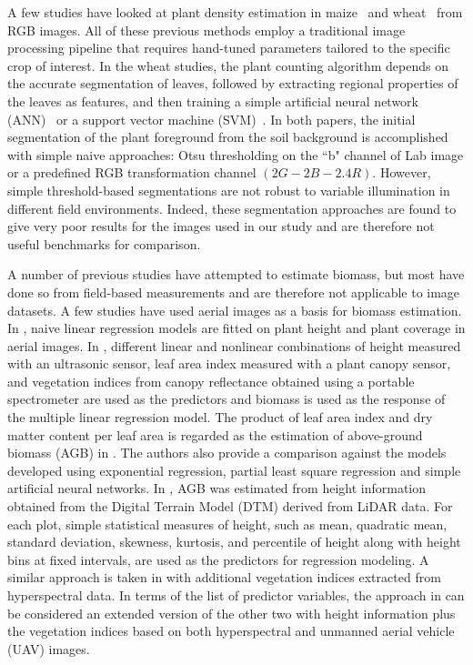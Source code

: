 \documentclass[10pt,twocolumn,letterpaper]{article}
\begin{document}
A few studies have looked at plant density estimation in maize~\cite{steward2001, steward2004, steward2005} and wheat~\cite{wheat-ann-2017, jin2017} from RGB images. All of these previous methods employ a traditional image processing pipeline that requires hand-tuned parameters tailored to the specific crop of interest.
In the wheat studies, the plant counting algorithm depends on the accurate segmentation of leaves, followed by extracting regional properties of the leaves as features, and then training a simple artificial neural network (ANN)~\cite{wheat-ann-2017} or a support vector machine (SVM)~\cite{jin2017}. In both papers, the initial segmentation of the plant foreground from the soil background is accomplished with simple naive approaches: Otsu thresholding on the ``b" channel of Lab image or a predefined RGB transformation channel $(2G-2B-2.4R)$. However, simple threshold-based segmentations are not robust to variable illumination in different field environments. Indeed, these segmentation approaches are found to give very poor results for the images used in our study and are therefore not useful benchmarks for comparison.


A number of previous studies have attempted to estimate biomass, but most have done so from field-based measurements and are therefore not applicable to image datasets. A few studies have used aerial images as a basis for biomass estimation. In \cite{schirrmann2016}, naive linear regression models are fitted on plant height and plant coverage in aerial images. In \cite{reddersen2014}, different linear and nonlinear combinations of height measured with an ultrasonic sensor, leaf area index measured with a plant canopy sensor, and vegetation indices from canopy reflectance obtained using a portable spectrometer are used as the predictors and biomass is used as the response of the multiple linear regression model. The product of leaf area index and dry matter content per leaf area is regarded as the estimation of above-ground biomass (AGB) in \cite{radiative2017}. The authors also provide a comparison against the models developed using exponential regression, partial least square regression and simple artificial neural networks. In \cite{laurin2016}, AGB was estimated from height information obtained from the Digital Terrain Model (DTM) derived from LiDAR data. For each plot, simple statistical measures of height, such as mean, quadratic mean, standard deviation, skewness, kurtosis, and percentile of height along with height bins at fixed intervals, are used as the predictors for regression modeling. A similar approach is taken in \cite{laurin2014} with additional vegetation indices extracted from hyperspectral data. In terms of the list of predictor variables, the approach in \cite{bendig2015} can be considered an extended version of the other two \cite{laurin2014, laurin2016} with height information plus the vegetation indices based on both hyperspectral and unmanned aerial vehicle (UAV) images.
\end{document}
